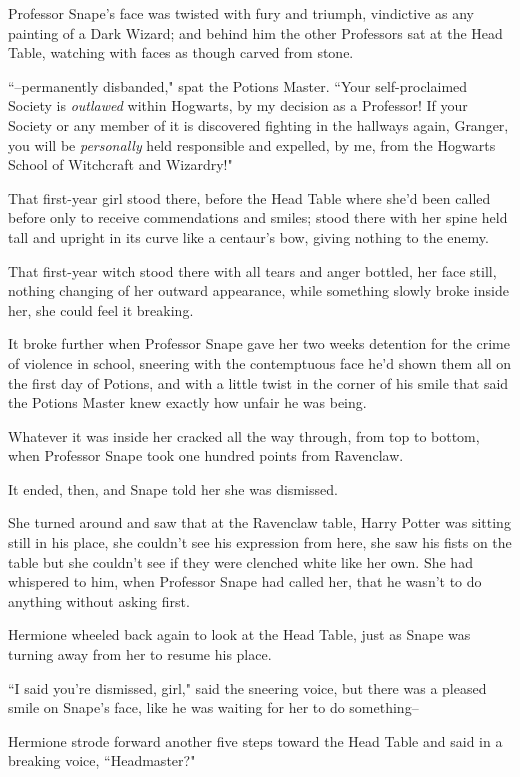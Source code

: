Professor Snape's face was twisted with fury and triumph, vindictive as any painting of a Dark Wizard; and behind him the other Professors sat at the Head Table, watching with faces as though carved from stone.

``\---permanently disbanded," spat the Potions Master. ``Your self-proclaimed Society is \emph{outlawed} within Hogwarts, by my decision as a Professor! If your Society or any member of it is discovered fighting in the hallways again, Granger, you will be \emph{personally} held responsible and expelled, by me, from the Hogwarts School of Witchcraft and Wizardry!"

That first-year girl stood there, before the Head Table where she'd been called before only to receive commendations and smiles; stood there with her spine held tall and upright in its curve like a centaur's bow, giving nothing to the enemy.

That first-year witch stood there with all tears and anger bottled, her face still, nothing changing of her outward appearance, while something slowly broke inside her, she could feel it breaking.

It broke further when Professor Snape gave her two weeks detention for the crime of violence in school, sneering with the contemptuous face he'd shown them all on the first day of Potions, and with a little twist in the corner of his smile that said the Potions Master knew exactly how unfair he was being.

Whatever it was inside her cracked all the way through, from top to bottom, when Professor Snape took one hundred points from Ravenclaw.

It ended, then, and Snape told her she was dismissed.

She turned around and saw that at the Ravenclaw table, Harry Potter was sitting still in his place, she couldn't see his expression from here, she saw his fists on the table but she couldn't see if they were clenched white like her own. She had whispered to him, when Professor Snape had called her, that he wasn't to do anything without asking first.

Hermione wheeled back again to look at the Head Table, just as Snape was turning away from her to resume his place.

``I said you're dismissed, girl," said the sneering voice, but there was a pleased smile on Snape's face, like he was waiting for her to do something\---

Hermione strode forward another five steps toward the Head Table and said in a breaking voice, ``Headmaster?"

